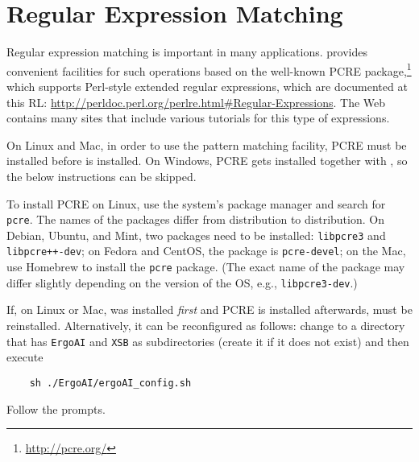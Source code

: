 
\section{Regular Expression Matching}
\label{sec-regexp}

Regular expression matching is important in many applications. \ERGO
provides convenient facilities for such operations based on the well-known
PCRE package,\footnote{
  \url{http://pcre.org/}
  }
which supports Perl-style extended regular expressions, which are
documented at this RL:
\url{http://perldoc.perl.org/perlre.html#Regular-Expressions}. The Web
contains many sites that include various tutorials for this type of
expressions.

On Linux and Mac,
in order to use the pattern matching facility, PCRE must be installed
before \ERGO is installed. On Windows, PCRE gets installed together with \ERGO,
so the below instructions can be skipped.

To install PCRE on Linux, use the system's package manager and search for
\texttt{pcre}. The names of the packages differ from distribution to
distribution. On Debian, Ubuntu, and Mint, two packages need to be installed:
\texttt{libpcre3} and \texttt{libpcre++-dev}; on Fedora and CentOS, the package is
\texttt{pcre-devel}; on the Mac, use Homebrew to install the \texttt{pcre}
package. (The exact name of the package may differ slightly depending on the
version of the OS, e.g., \texttt{libpcre3-dev}.)

If, on Linux or Mac, \ERGO was installed \emph{first} and PCRE is
installed afterwards, \ERGOAI must be reinstalled.
Alternatively, it can be reconfigured as follows: change to a
directory that has \texttt{ErgoAI} and
\texttt{XSB} as subdirectories (create it if it does not exist) and then execute
\begin{verbatim}
    sh ./ErgoAI/ergoAI_config.sh
\end{verbatim}
Follow the prompts.

